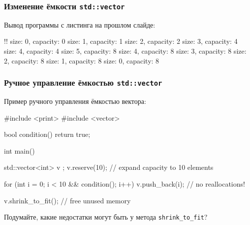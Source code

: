 \documentclass[compress, 8pt, aspectratio=169]{beamer}
\begin{document}
  \begin{frame}[fragile]

    \frametitle{Изменение ёмкости \texttt{std::vector}}

    Вывод программы с листинга на прошлом слайде:

    \begin{terminalwindow}
!!
size: 0, capacity: 0
size: 1, capacity: 1
size: 2, capacity: 2
size: 3, capacity: 4
size: 4, capacity: 4
size: 5, capacity: 8
size: 4, capacity: 8
size: 3, capacity: 8
size: 2, capacity: 8
size: 1, capacity: 8
size: 0, capacity: 8
    \end{terminalwindow}

  \end{frame}

  \begin{frame}[fragile]

    \frametitle{Ручное управление ёмкостью \texttt{std::vector}}

    Пример ручного управления ёмкостью вектора:

    \begin{mycppinplacelisting}
#include <print>
#include <vector>

bool condition() { return true; }

int main() {
    std::vector<int> v {};
    v.reserve(10); // expand capacity to 10 elements

    for (int i = 0; i < 10 && condition(); i++) {
        v.push_back(i); // no reallocations!
    }

    v.shrink_to_fit(); // free unused memory
}
    \end{mycppinplacelisting}

    \begin{task}
      Подумайте, какие недостатки могут быть у метода \verb|shrink_to_fit|?
    \end{task}

  \end{frame}
\end{document}
